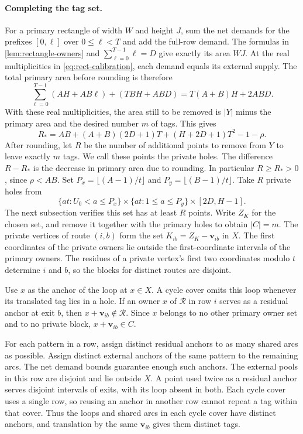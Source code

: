 \documentclass[10pt]{article}
\numberwithin{equation}{section}
\theoremstyle{definition}
\begin{document}
\paragraph{Completing the tag set.}
For a primary rectangle of width $W$ and height $J$, sum the net demands for the prefixes $[0,\ell]$ over $0\le\ell<T$ and add the full-row demand. The formulas in \cref{lem:rectangle-owners} and $\sum_{\ell=0}^{T-1}\ell=D$ give exactly its area $WJ$. At the real multiplicities in \cref{eq:rect-calibration}, each demand equals its external supply. The total primary area before rounding is therefore
\[
 \sum_{\ell=0}^{T-1}(AH+AB\ell)+(TBH+ABD)=T(A+B)H+2ABD.
\]
With these real multiplicities, the area still to be removed is $|Y|$ minus the primary area and the desired number $m$ of tags. This gives
\begin{equation}\label{eq:rect-residue}
 R_*=AB+(A+B)(2D+1)T+(H+2D+1)T^2-1-\rho.
\end{equation}
After rounding, let $R$ be the number of additional points to remove from $Y$ to leave exactly $m$ tags. We call these points the private holes. The difference $R-R_*$ is the decrease in primary area due to rounding. In particular $R\ge R_*>0$, since $\rho<AB$. Set $P_x=\lfloor(A-1)/t\rfloor$ and $P_y=\lfloor(B-1)/t\rfloor$. Take $R$ private holes from
\[
 \{at:U_0<a\le P_x\}\times\{at:1\le a\le P_y\}\times[2D,H-1].
\]
The next subsection verifies this set has at least $R$ points. Write $Z_K$ for the chosen set, and remove it together with the primary holes to obtain $|C|=m$. The private vertices of route $(i,b)$ form the set $K_{ib}=Z_K-\mathbf v_{ib}$ in $X$. The first coordinates of the private owners lie outside the first-coordinate intervals of the primary owners. The residues of a private vertex's first two coordinates modulo $t$ determine $i$ and $b$, so the blocks for distinct routes are disjoint.

Use $x$ as the anchor of the loop at $x\in X$. A cycle cover omits this loop whenever its translated tag lies in a hole. If an owner $x$ of $\mathcal R$ in row $i$ serves as a residual anchor at exit $b$, then $x+\mathbf v_{ib}\notin\mathcal R$. Since $x$ belongs to no other primary owner set and to no private block, $x+\mathbf v_{ib}\in C$.

For each pattern in a row, assign distinct residual anchors to as many shared arcs as possible. Assign distinct external anchors of the same pattern to the remaining arcs. The net demand bounds guarantee enough such anchors. The external pools in this row are disjoint and lie outside $X$. A point used twice as a residual anchor serves disjoint intervals of exits, with its loop absent in both. Each cycle cover uses a single row, so reusing an anchor in another row cannot repeat a tag within that cover. Thus the loops and shared arcs in each cycle cover have distinct anchors, and translation by the same $\mathbf v_{ib}$ gives them distinct tags.
\end{document}
